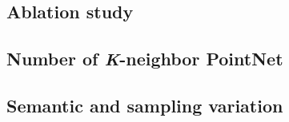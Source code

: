 \subsection{Ablation study}
\subsection{Number of \textit{K}-neighbor PointNet}
\subsection{Semantic and sampling variation}